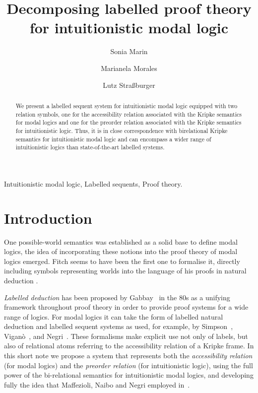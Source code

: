 \documentclass[twoside]{aiml18}
\begin{document}
\begin{frontmatter}
  \title{Decomposing labelled proof theory for intuitionistic modal logic}
  \author{Sonia Marin}
  \address{IT-Universitetet i K{\o}benhavn \\ Denmark }
 \author{Marianela Morales}
 \address{Universidad Nacional de C\'ordoba \\ Argentina}
   \author{Lutz Stra{\ss}burger}
 \address{Inria Saclay \& LIX, \'Ecole Polytechnique \\ France}

 \begin{abstract}
   We present a labelled sequent system for intuitionistic modal logic equipped 
   with two relation symbols, one for the accessibility
   relation associated with the Kripke semantics for modal logics and
   one for the preorder relation associated with the Kripke semantics
   for intuitionistic logic. 
   Thus, it is in close correspondence with birelational Kripke semantics for intuitionistic modal logic and can encompass a wider range of intuitionistic logics than state-of-the-art labelled systems.


  \end{abstract}

  \begin{keyword}
  Intuitionistic modal logic, Labelled sequents, Proof theory.
  \end{keyword}
 \end{frontmatter}


\section{Introduction}
One possible-world semantics was established as a solid base to define modal logics, the idea of incorporating these notions into the proof theory of modal logics emerged. Fitch seems to have been the first one to formalise it, directly including symbols representing worlds into the language of his proofs in natural deduction \cite{Fitch}.

\emph{Labelled deduction} has been proposed by Gabbay~\cite{Gabbay} in the 80s as a unifying framework throughout proof theory in order to provide proof
systems for a wide range of logics. 
%
For modal logics it can take
the form of labelled natural deduction and labelled sequent systems as
used, for example, by Simpson~\cite{Simpson}, Vigan\`o~\cite{Vigano}, and
Negri~\cite{Negri}. 
%
These formalisms make explicit use not only of
labels, but also of relational atoms referring to the accessibility relation of a Kripke frame.
%
In this short note we propose a system that represents both the \emph{accessibility relation} (for modal
logics) and the \emph{preorder relation} (for intuitionistic
logic), using the full power of the bi-relational semantics for
intuitionistic modal logics,
and developing fully the idea that Maffezioli, Naibo and Negri employed in~\cite{Maffezioli}. 
\end{document}
